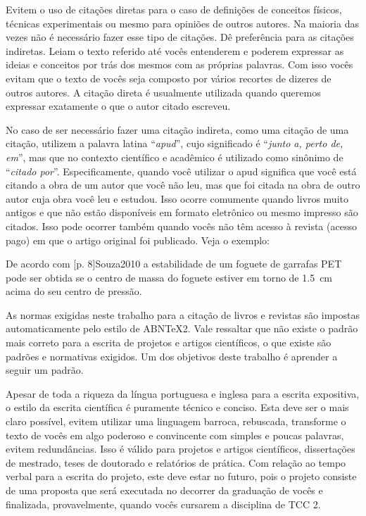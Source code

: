 \documentclass[12pt,oneside,brazil,hidelinks,article,sumario=tradicional,a4paper]{abntex2}
\begin{document}
Evitem o uso de citações diretas para o caso de definições de conceitos físicos, técnicas experimentais ou mesmo para opiniões de outros autores. Na maioria das vezes não é necessário fazer esse tipo de citações. Dê preferência para as citações indiretas. Leiam o texto referido até vocês entenderem e poderem expressar as ideias e conceitos por trás dos mesmos com as próprias palavras. Com isso vocês evitam que o texto de vocês seja composto por vários recortes de dizeres de outros autores. A citação direta é usualmente utilizada quando queremos expressar exatamente o que o autor citado escreveu.

No caso de ser necessário fazer uma citação indireta, como uma citação de uma citação, utilizem a palavra latina ``\emph{apud}'', cujo significado é ``\emph{junto a, perto de, em}'', mas que no contexto científico e acadêmico é utilizado como sinônimo de ``\emph{citado por}''. Especificamente, quando você utilizar o apud significa que você está citando a obra de um autor que você não leu, mas que foi citada na obra de outro autor cuja obra você leu e estudou. Isso ocorre comumente quando livros muito antigos e que não estão disponíveis em formato eletrônico ou mesmo impresso são citados. Isso pode ocorrer também quando vocês não têm acesso à revista (acesso pago) em que o artigo original foi publicado. Veja o exemplo:

De acordo com [p. 8]{Souza2010} a estabilidade de um foguete de garrafas PET pode ser obtida se o centro de massa do foguete estiver em torno de \SI{1.5}{\centi\meter} acima do seu centro de pressão.

As normas exigidas neste trabalho para a citação de livros e revistas são impostas automaticamente pelo estilo de ABN{\TeX}2. Vale ressaltar que não existe o padrão mais correto para a escrita de projetos e artigos científicos, o que existe são padrões e normativas exigidos. Um dos objetivos deste trabalho é aprender a seguir um padrão.

Apesar de toda a riqueza da língua portuguesa e inglesa para a escrita expositiva, o estilo da escrita científica é puramente técnico e conciso. Esta deve ser o mais claro possível, evitem utilizar uma linguagem barroca, rebuscada, transforme o texto de vocês em algo poderoso e convincente com simples e poucas palavras, evitem redundâncias. Isso é válido para projetos e artigos científicos, dissertações de mestrado, teses de doutorado e relatórios de prática. {\color{red}Com relação ao tempo verbal para a escrita do projeto, este deve estar no futuro, pois o projeto consiste de uma proposta que será executada no decorrer da graduação de vocês e finalizada, provavelmente, quando vocês cursarem a disciplina de TCC 2.}
\end{document}
